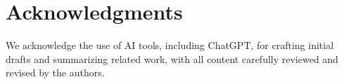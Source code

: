 \section{Acknowledgments}

We acknowledge the use of AI tools, including ChatGPT, for crafting initial drafts and summarizing related work, with all content carefully reviewed and revised by the authors.

